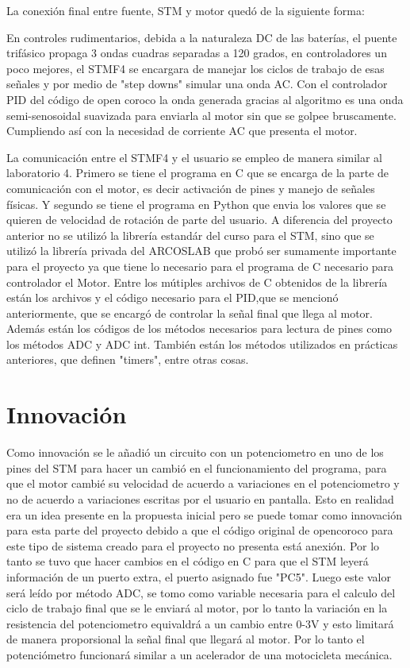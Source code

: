 \documentclass[letterpaper]{article}
\begin{document}
La conexión final entre fuente, STM y motor quedó de la siguiente forma:
 
En controles rudimentarios, debida a la naturaleza DC de las baterías, el puente trifásico propaga 3 ondas cuadras separadas a 120 grados, en controladores un poco mejores, el STMF4 se encargara de manejar los ciclos de trabajo de esas señales y por medio de "step downs" simular una onda AC. Con el controlador PID del código de open coroco la onda generada gracias al algoritmo es una onda semi-senosoidal suavizada para enviarla al motor sin que se golpee bruscamente.
Cumpliendo así con la necesidad de corriente AC que presenta el motor.
 
La comunicación entre el STMF4 y el usuario se empleo de manera similar al laboratorio 4. Primero se tiene el programa en C que se encarga de la parte de comunicación
con el motor, es decir activación de pines y manejo de señales físicas. Y segundo se tiene el programa en Python que envia los valores que se quieren de velocidad de rotación de parte del usuario.
A diferencia del proyecto anterior no se utilizó la librería estandár del curso para el STM, sino que se utilizó la librería privada del ARCOSLAB que probó ser sumamente importante para el proyecto ya que tiene lo necesario para el programa de C necesario para controlador el Motor. 
Entre los mútiples archivos de C obtenidos de la librería están los archivos y el código necesario para el PID,que se mencionó anteriormente, que se encargó
de controlar la señal final que llega al motor. Además están los códigos de los métodos necesarios para lectura de pines como los métodos ADC y ADC int. También están los métodos utilizados en prácticas
anteriores, que definen "timers", entre otras cosas.
 
\section{Innovación}
Como innovación se le añadió un circuito con un potenciometro en uno de los pines del STM para hacer un cambió en el funcionamiento del programa, para que el motor cambié su velocidad 
de acuerdo a variaciones en el potenciometro y no de acuerdo a variaciones escritas por el usuario en pantalla. Esto en realidad era un idea presente en la propuesta inicial pero se puede tomar como innovación
para esta parte del proyecto debido a que el código original de opencoroco para este tipo de sistema creado para el proyecto no presenta está anexión. Por lo tanto se tuvo que hacer cambios en el código en C
para que el STM leyerá información de un puerto extra, el puerto asignado fue "PC5". Luego este valor será leído por método ADC, se tomo como variable necesaria para el calculo del ciclo de trabajo final que se le enviará al motor, por lo tanto
la variación en la resistencia del potenciometro equivaldrá a un cambio entre 0-3V y esto limitará de manera proporsional la señal final que llegará al motor. Por lo tanto el potenciómetro funcionará 
similar a un acelerador de una motocicleta mecánica.
\end{document}
